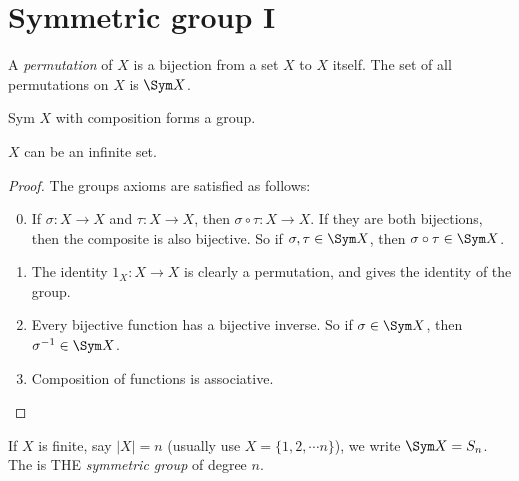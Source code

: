 \documentclass[a4pape]{article}
\begin{document}
\section{Symmetric group I}
\begin{defi}[Permutation]
  A \emph{permutation} of $X$ is a bijection from a set $X$ to $X$ itself. The set of all permutations on $X$ is $\Sym X$.
\end{defi}

\begin{thm}
  Sym $X$ with composition forms a group.
\end{thm}
\note $X$ can be an infinite set.

\begin{proof}
  The groups axioms are satisfied as follows:
  \begin{enumerate}[label=\arabic{*}.]
  \setcounter{enumi}{-1}
  \item If $\sigma: X\to X$ and $\tau: X\to X$, then $\sigma\circ\tau:X\to X$. If they are both bijections, then the composite is also bijective. So if $\sigma, \tau\in \Sym X$, then $\sigma\circ\tau\in\Sym X$.
  \item The identity $1_X:X\to X$ is clearly a permutation, and gives the identity of the group.
  \item Every bijective function has a bijective inverse. So if $\sigma\in \Sym X$, then $\sigma^{-1} \in \Sym X$.
  \item Composition of functions is associative.
  \end{enumerate}
\end{proof}
\begin{defi}
  If $X$ is finite, say $|X| = n$ (usually use $X = \{1, 2, \cdots n\}$), we write $\Sym X = S_n$. The is THE \emph{symmetric group} of degree $n$.
\end{defi}
\end{document}
